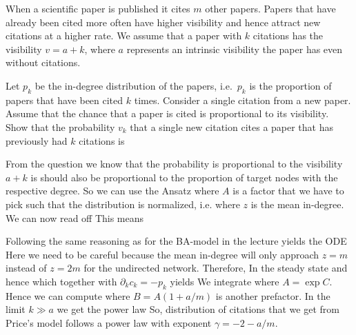 \label{exGrowthPrice}
When a scientific paper is published it cites $m$ other papers. Papers that have already been cited more often have higher visibility and hence attract new citations at a higher rate. We assume that a paper with $k$ citations has the visibility $v=a+k$, where $a$ represents an intrinsic visibility the paper has even without citations. 

\subquestion Let $p_k$ be the in-degree distribution of the papers, i.e.~$p_k$ is the proportion of papers that have been cited $k$ times. Consider a single citation from a new paper. Assume that the chance that a paper is cited is proportional to its visibility. Show that the probability $v_k$ that a single new citation cites a paper that has previously had $k$ citations is 

\solution
From the question we know that the probability is proportional to the visibility $a+k$ is should also be proportional to the proportion of target nodes with the respective degree. So we can use the Ansatz
where $A$ is a factor that we have to pick such that the distribution is normalized, i.e.
where $z$ is the mean in-degree. We can now read off 
This means  


\solution
Following the same reasoning as for the BA-model in the lecture yields the ODE
Here we need to be careful because the mean in-degree will only approach 
$z=m$ instead of $z=2m$ for the undirected network. Therefore, 
In the steady state
and hence
which together with $\partial_k c_k =-p_k$ yields
We integrate 
where $A=\exp{C}$. Hence we can compute 
where $B=A(1+a/m)$ is another prefactor. In the limit $k\gg a$ we get the power law
So, distribution of citations that we get from Price's model follows a power law with exponent $\gamma=-2-a/m$.
